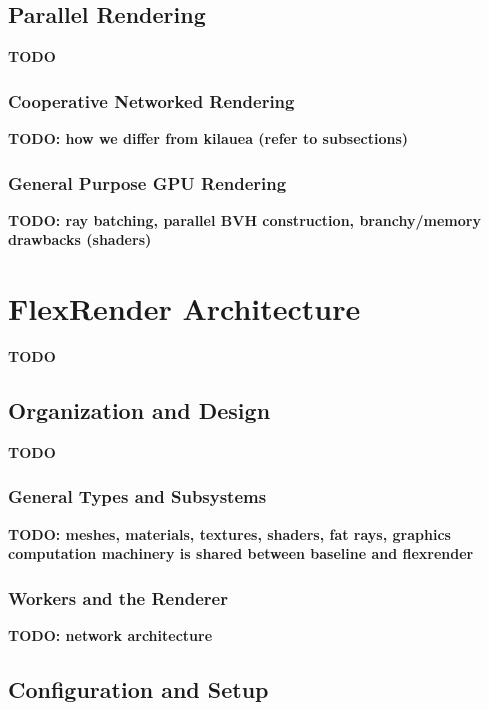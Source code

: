 \documentclass[12pt]{ucthesis}
\begin{document}
\section{Parallel Rendering}
\label{parallelbg}

\textbf{TODO}

\subsection{Cooperative Networked Rendering}
\label{networked}

\textbf{TODO: how we differ from kilauea (refer to subsections) \cite{kato:2002}}

\subsection{General Purpose GPU Rendering}
\label{gpgpu}

\textbf{TODO: ray batching, parallel BVH construction, branchy/memory drawbacks (shaders)}

\chapter{FlexRender Architecture}
\label{architecture}

\textbf{TODO}

\section{Organization and Design}
\label{organization}

\textbf{TODO}

\subsection{General Types and Subsystems}
\label{types}

\textbf{TODO: meshes, materials, textures, shaders, fat rays, graphics computation machinery is shared between baseline and flexrender}

\subsection{Workers and the Renderer}
\label{workers}

\textbf{TODO: network architecture}

\section{Configuration and Setup}
\label{config}
\end{document}
